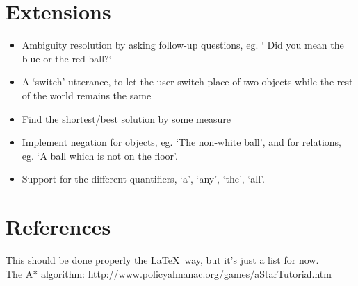 \documentclass[11pt]{article}
\begin{document}
\section*{Extensions}
\begin{itemize}
\item Ambiguity resolution by asking follow-up questions, eg. ` Did you mean the blue or the red ball?`
\item A `switch' utterance, to let the user switch place of two objects while the rest of the world remains the same
\item Find the shortest/best solution by some measure
\item Implement negation for objects, eg. `The non-white ball', and for relations, eg. `A ball which is not on the floor'.
\item Support for the different quantifiers, `a', `any', `the', `all'.
\end{itemize}
\newpage


\section*{References}
This should be done properly the \LaTeX\, way, but it's just a list for now. \\
The A* algorithm: http://www.policyalmanac.org/games/aStarTutorial.htm
\end{document}
